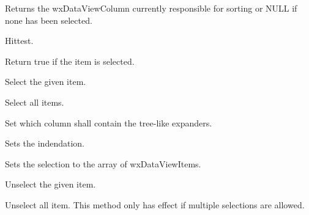 
Returns the wxDataViewColumn currently responsible for sorting
or NULL if none has been selected.

\label{wxdataviewctrlhittest}


Hittest.

\label{wxdataviewctrlisselected}


Return true if the item is selected.

\label{wxdataviewctrlselect}


Select the given item.

\label{wxdataviewctrlselectall}


Select all items.

\label{wxdataviewctrlsetexpandercolumn}


Set which column shall contain the tree-like expanders.

\label{wxdataviewctrlsetindent}


Sets the indendation.

\label{wxdataviewctrlsetselections}


Sets the selection to the array of wxDataViewItems.

\label{wxdataviewctrlunselect}


Unselect the given item.

\label{wxdataviewctrlunselectall}


Unselect all item. This method only has effect if multiple
selections are allowed.

